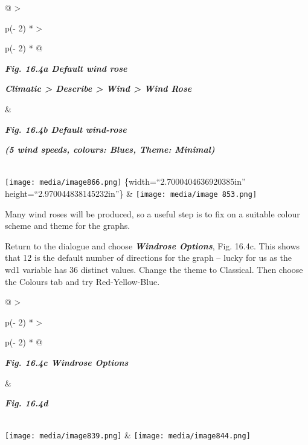 \documentclass[
  letterpaper,
  DIV=11,
  numbers=noendperiod]{scrreprt}
\begin{document}
\begin{longtable}[]{@{}
  >{\raggedright\arraybackslash}p{(\columnwidth - 2\tabcolsep) * }
  >{\raggedright\arraybackslash}p{(\columnwidth - 2\tabcolsep) * }@{}}
\toprule\noalign{}
\begin{minipage}[b]{\linewidth}\raggedright
\textbf{\emph{Fig. 16.4a Default wind rose}}

\textbf{\emph{Climatic \textgreater{} Describe \textgreater{} Wind
\textgreater{} Wind Rose}}
\end{minipage} & \begin{minipage}[b]{\linewidth}\raggedright
\textbf{\emph{Fig. 16.4b Default wind-rose}}

\textbf{\emph{(5 wind speeds, colours: Blues, Theme: Minimal)}}
\end{minipage} \\
\midrule\noalign{}
\endhead
\bottomrule\noalign{}
\endlastfoot
\texttt{[image: media/image866.png]} \{width=``2.7000404636920385in''
height=``2.970044838145232in''\} &
\texttt{[image: media/image 853.png]} \\
\end{longtable}

Many wind roses will be produced, so a useful step is to fix on a
suitable colour scheme and theme for the graphs.

Return to the dialogue and choose \textbf{\emph{Windrose Options}}, Fig.
16.4c. This shows that 12 is the default number of directions for the
graph -- lucky for us as the wd1 variable has 36 distinct values. Change
the theme to Classical. Then choose the Colours tab and try
Red-Yellow-Blue.

\begin{longtable}[]{@{}
  >{\raggedright\arraybackslash}p{(\columnwidth - 2\tabcolsep) * }
  >{\raggedright\arraybackslash}p{(\columnwidth - 2\tabcolsep) * }@{}}
\toprule\noalign{}
\begin{minipage}[b]{\linewidth}\raggedright
\textbf{\emph{Fig. 16.4c Windrose Options}}
\end{minipage} & \begin{minipage}[b]{\linewidth}\raggedright
\textbf{\emph{Fig. 16.4d}}
\end{minipage} \\
\midrule\noalign{}
\endhead
\bottomrule\noalign{}
\endlastfoot
\texttt{[image: media/image839.png]} &
\texttt{[image: media/image844.png]} \\
\end{longtable}
\end{document}
